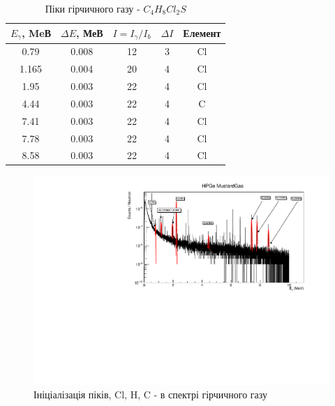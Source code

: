 \documentclass[a4paper, 14pt]{article}
\numberwithin{equation}{section}
\numberwithin{table}{section}
\begin{document}
\begin{table}[h]
	\centering
	\begin{tabular}{|c|c|c|c|c|} 
		\hline
		$E_{\gamma}$, MeВ & $\Delta{E}$, МеВ & $I = I_{\gamma} / I_{b}$ & $\Delta{I}$ & Елемент\\
		\hline
		0.79 & 0.008 & 12 & 3 & Cl\\
		\hline
		1.165 & 0.004 & 20 & 4 & Cl \\	
		\hline
		1.95 & 0.003 & 22 & 4 & Cl \\	
		\hline		
		4.44 & 0.003 & 22 & 4 & C \\	
		\hline
		7.41 & 0.003 & 22 & 4 & Cl\\	
		\hline
		7.78 & 0.003 & 22 & 4 & Cl\\	
		\hline			
		8.58 & 0.003 & 22 & 4 & Cl\\	
		\hline
	\end{tabular}
	\caption{Піки гірчичного газу - $C_4H_8Cl_2S$} 
	\label{tabl:ResultsMustard}
\end{table}

\begin{figure}[hbt!]
	\centering \includegraphics[width=1\textwidth]{res/mustard_gas.pdf}
	\caption{Ініціалізація піків, Cl, H, C - в спектрі гірчичного газу} 
	\label{ris:mustard}	
\end{figure} 
\end{document}
